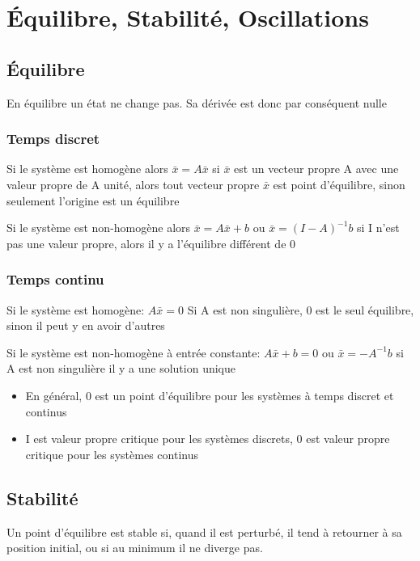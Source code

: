 \documentclass[resume]{subfiles}
\begin{document}
\section{Équilibre, Stabilité, Oscillations}

\subsection{Équilibre}

En équilibre un état ne change pas. Sa dérivée est donc par conséquent nulle  

\subsubsection{Temps discret}

Si le système est homogène alors $\bar{x}=A\bar{x}$ si $\bar{x}$ est un vecteur propre A avec une valeur propre de A unité, alors tout vecteur propre $\bar{x}$ est point d'équilibre, sinon seulement l'origine est un équilibre  

Si le système est non-homogène alors $\bar{x}= A\bar{x}+b$ ou $\bar{x} = (I - A)^{-1}b$ si I n'est pas une valeur propre, alors il y a l'équilibre différent de 0

\subsubsection{Temps continu}

Si le système est homogène: $A\bar{x}=0$ Si A est non singulière, 0
est le seul équilibre, sinon il peut y en avoir d'autres  

Si le système est non-homogène à entrée constante: $A\bar{x}+b=0$ ou $\bar{x}=-A^{-1}b$ 
si A est non singulière il y a une solution unique
\begin{itemize}
\item En général, 0 est un point d'équilibre pour les systèmes à
  temps discret et continus
\item I est valeur propre critique pour les systèmes discrets, 0
  est valeur propre critique pour les systèmes continus  
\end{itemize}

\subsection{Stabilité}

Un point d'équilibre est stable si, quand il est perturbé, il tend à retourner à sa position initial, ou si au minimum il ne diverge pas.
\end{document}
